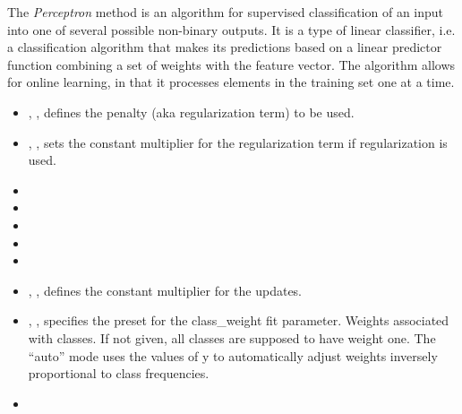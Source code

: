 The \textit{Perceptron} method is an algorithm for supervised classification of
an input into one of several possible non-binary outputs.
%
It is a type of linear classifier, i.e. a classification algorithm that makes
its predictions based on a linear predictor function combining a set of weights
with the feature vector.
%
The algorithm allows for online learning, in that it processes elements in the
training set one at a time.
%
\begin{itemize}
  \item {}, , defines
  the penalty (aka regularization term) to be used.
  \item {}, , sets the constant multiplier for the
  regularization term if regularization is used.
  \item {}
  \item {}
  \item {}
  \item {}
  \item \verDescriptionB{}
  \item {}, , defines the constant
  multiplier for the updates.
  \item {}, , specifies the
  preset for the class\_weight fit parameter.
  Weights associated with classes.
  If not given, all classes are supposed to have weight one.
  The ``auto'' mode uses the values of y to automatically adjust weights
  inversely proportional to class frequencies.
  \item \warmStartDescription{}
\end{itemize}

